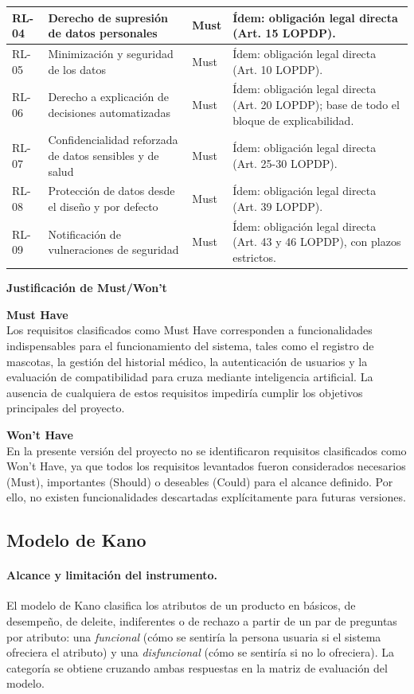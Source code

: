 \documentclass[journal,onecolumn]{IEEEtran}
\begin{document}
\begin{longtable}{@{}p{1.6cm} p{4.8cm} p{1.6cm} p{5.2cm}@{}}
		\hline
		RL-04 & Derecho de supresión de datos personales & Must & Ídem: obligación legal directa (Art. 15 LOPDP). \\
		\hline
		RL-05 & Minimización y seguridad de los datos & Must & Ídem: obligación legal directa (Art. 10 LOPDP). \\
		\hline
		RL-06 & Derecho a explicación de decisiones automatizadas & Must & Ídem: obligación legal directa (Art. 20 LOPDP); base de todo el bloque de explicabilidad. \\
		\hline
		RL-07 & Confidencialidad reforzada de datos sensibles y de salud & Must & Ídem: obligación legal directa (Art. 25-30 LOPDP). \\
		\hline
		RL-08 & Protección de datos desde el diseño y por defecto & Must & Ídem: obligación legal directa (Art. 39 LOPDP). \\
		\hline
		RL-09 & Notificación de vulneraciones de seguridad & Must & Ídem: obligación legal directa (Art. 43 y 46 LOPDP), con plazos estrictos. \\
	\end{longtable}
	
	\textbf{Justificación de Must/Won't}
	
	\textbf{Must Have} \\
	Los requisitos clasificados como Must Have corresponden a funcionalidades
	indispensables para el funcionamiento del sistema, tales como el registro de
	mascotas, la gestión del historial médico, la autenticación de usuarios y la
	evaluación de compatibilidad para cruza mediante inteligencia artificial. La
	ausencia de cualquiera de estos requisitos impediría cumplir los objetivos
	principales del proyecto.
	
	\textbf{Won't Have} \\
	En la presente versión del proyecto no se identificaron requisitos
	clasificados como Won't Have, ya que todos los requisitos levantados fueron
	considerados necesarios (Must), importantes (Should) o deseables (Could) para
	el alcance definido. Por ello, no existen funcionalidades descartadas
	explícitamente para futuras versiones.
	
	\subsection{Modelo de Kano}
	\label{sec:kano}
	
	\paragraph{Alcance y limitación del instrumento.}
	El modelo de Kano \cite{kano1984} clasifica los atributos de un producto en
	básicos, de desempeño, de deleite, indiferentes o de rechazo a partir de un
	par de preguntas por atributo: una \emph{funcional} (cómo se sentiría la
	persona usuaria si el sistema ofreciera el atributo) y una
	\emph{disfuncional} (cómo se sentiría si no lo ofreciera). La categoría se
	obtiene cruzando ambas respuestas en la matriz de evaluación del modelo.
	
\end{document}
